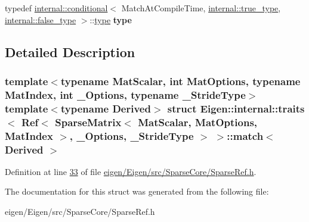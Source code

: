 \begin{DoxyCompactItemize}
\mbox{\label{struct_eigen_1_1internal_1_1traits_3_01_ref_3_01_sparse_matrix_3_01_mat_scalar_00_01_mat_optionsc6ef0ce4e339306d76a1e27f17721ded_a56a976fd13a3fadcc937fb3030f492f0}} 
typedef \hyperlink{struct_eigen_1_1internal_1_1conditional}{internal\+::conditional}$<$ Match\+At\+Compile\+Time, \hyperlink{struct_eigen_1_1internal_1_1true__type}{internal\+::true\+\_\+type}, \hyperlink{struct_eigen_1_1internal_1_1false__type}{internal\+::false\+\_\+type} $>$\+::\hyperlink{class_eigen_1_1internal_1_1_tensor_lazy_evaluator_writable}{type} {\bfseries type}
\end{DoxyCompactItemize}


\subsection{Detailed Description}
\subsubsection*{template$<$typename Mat\+Scalar, int Mat\+Options, typename Mat\+Index, int \+\_\+\+Options, typename \+\_\+\+Stride\+Type$>$\newline
template$<$typename Derived$>$\newline
struct Eigen\+::internal\+::traits$<$ Ref$<$ Sparse\+Matrix$<$ Mat\+Scalar, Mat\+Options, Mat\+Index $>$, \+\_\+\+Options, \+\_\+\+Stride\+Type $>$ $>$\+::match$<$ Derived $>$}



Definition at line \hyperlink{eigen_2_eigen_2src_2_sparse_core_2_sparse_ref_8h_source_l00033}{33} of file \hyperlink{eigen_2_eigen_2src_2_sparse_core_2_sparse_ref_8h_source}{eigen/\+Eigen/src/\+Sparse\+Core/\+Sparse\+Ref.\+h}.



The documentation for this struct was generated from the following file\+:\begin{DoxyCompactItemize}
\item 
eigen/\+Eigen/src/\+Sparse\+Core/\+Sparse\+Ref.\+h\end{DoxyCompactItemize}
